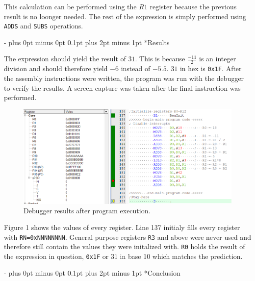 \documentclass[\FontSize\FontUnit,letterpaper,oneside]{article}
\makeatletter
\def\code#1{\texttt{#1}}
\renewcommand \section{
    \@startsection{section}{1}{\z@}
      {\dimexpr \FontSize\FontUnit * 2 - \parskip \relax plus 0pt minus 0pt}
      {0.1pt plus 2pt minus 1pt} %
      {\normalfont\normalsize\bfseries}}
\makeatother
\begin{document}
This calculation can be performed using the $R1$ register because the previous result is no
loonger needed. The rest of the expression is simply performed using \code{ADDS} and \code{SUBS}
operations.

\section*{Results}

The expression should yield the result of $31$. This is because $\frac{-11}{2}$
is an integer division and should therefore yield $-6$ instead of $-5.5$. $31$ 
in hex is \code{0x1F}. After the assembly instructions were written, the program
was run with the debugger to verify the results. A screen capture was taken after
the final instruction was performed.

\pagebreak

\begin{figure}[h!]
	\centering
	\includegraphics[width=\textwidth]{capture}
	\caption{Debugger results after program execution.}
	\label{fig:capture}
\end{figure}

Figure 1 shows the values of every register. Line 137 initialy fills every register with
\code{RN=0xNNNNNNNN}. General purpose registers \code{R3} and above were never used and
therefore still contain the values they were initalized with. \code{R0} holds the result
of the expression in question, \code{0x1F} or $31$ in base 10 which matches the prediction.

\section*{Conclusion}
\end{document}

